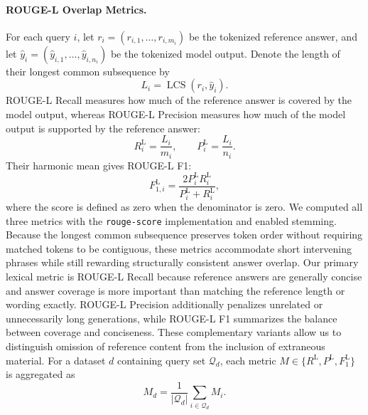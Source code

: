 \paragraph{ROUGE-L Overlap Metrics.}
For each query $i$, let $r_i=(r_{i,1},\ldots,r_{i,m_i})$ be the tokenized reference answer, and let $\hat{y}_i=(\hat{y}_{i,1},\ldots,\hat{y}_{i,n_i})$ be the tokenized model output. Denote the length of their longest common subsequence by
\begin{equation}
L_i=\operatorname{LCS}(r_i,\hat{y}_i).
\label{eq:rougel-lcs}
\end{equation}
ROUGE-L Recall measures how much of the reference answer is covered by the model output, whereas ROUGE-L Precision measures how much of the model output is supported by the reference answer:
\begin{equation}
R_i^{\mathrm{L}}=\frac{L_i}{m_i},
\qquad
P_i^{\mathrm{L}}=\frac{L_i}{n_i}.
\label{eq:rougel-recall-precision}
\end{equation}
Their harmonic mean gives ROUGE-L F1:
\begin{equation}
F_{1,i}^{\mathrm{L}}
=
\frac{2P_i^{\mathrm{L}}R_i^{\mathrm{L}}}
{P_i^{\mathrm{L}}+R_i^{\mathrm{L}}},
\label{eq:rougel-f1}
\end{equation}
where the score is defined as zero when the denominator is zero. We computed all three metrics with the \texttt{rouge-score} implementation and enabled stemming. Because the longest common subsequence preserves token order without requiring matched tokens to be contiguous, these metrics accommodate short intervening phrases while still rewarding structurally consistent answer overlap. Our primary lexical metric is ROUGE-L Recall because reference answers are generally concise and answer coverage is more important than matching the reference length or wording exactly. ROUGE-L Precision additionally penalizes unrelated or unnecessarily long generations, while ROUGE-L F1 summarizes the balance between coverage and conciseness. These complementary variants allow us to distinguish omission of reference content from the inclusion of extraneous material. For a dataset $d$ containing query set $\mathcal{Q}_d$, each metric $M\in\{R^{\mathrm{L}},P^{\mathrm{L}},F_1^{\mathrm{L}}\}$ is aggregated as
\begin{equation}
M_d=\frac{1}{|\mathcal{Q}_d|}\sum_{i\in\mathcal{Q}_d}M_i.
\label{eq:rougel-dataset-aggregation}
\end{equation}

